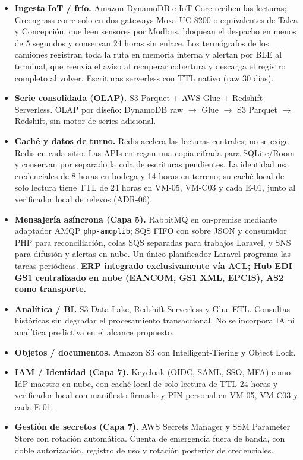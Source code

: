 \begin{itemize}
  \item \textbf{Ingesta IoT / frío.} Amazon DynamoDB e IoT Core reciben las lecturas; Greengrass corre solo en dos gateways Moxa UC-8200 o equivalentes de Talca y Concepción, que leen sensores por Modbus, bloquean el despacho en menos de 5 segundos y conservan 24 horas sin enlace. Los termógrafos de los camiones registran toda la ruta en memoria interna y alertan por BLE al terminal, que reenvía el aviso al recuperar cobertura y descarga el registro completo al volver. Escrituras serverless con TTL nativo (raw 30 días).
  \item \textbf{Serie consolidada (OLAP).} S3 Parquet + AWS Glue + Redshift Serverless. OLAP por diseño: DynamoDB raw $\rightarrow$ Glue $\rightarrow$ S3 Parquet $\rightarrow$ Redshift, sin motor de series adicional.
  \item \textbf{Caché y datos de turno.} Redis acelera las lecturas centrales; no se exige Redis en cada sitio. Las APIs entregan una copia cifrada para SQLite/Room y conservan por separado la cola de escrituras pendientes. La identidad usa credenciales de 8 horas en bodega y 14 horas en terreno; su caché local de solo lectura tiene TTL de 24 horas en VM-05, VM-C03 y cada E-01, junto al verificador local de relevos (ADR-06).
  \item \textbf{Mensajería asíncrona (Capa 5).} RabbitMQ en on-premise mediante adaptador AMQP \texttt{php-amqplib}; SQS FIFO con sobre JSON y consumidor PHP para reconciliación, colas SQS separadas para trabajos Laravel, y SNS para difusión y alertas en nube. Un único planificador Laravel programa las tareas periódicas. \textbf{ERP integrado exclusivamente vía ACL; Hub EDI GS1 centralizado en nube (EANCOM, GS1 XML, EPCIS), AS2 como transporte.}
  \item \textbf{Analítica / BI.} S3 Data Lake, Redshift Serverless y Glue ETL. Consultas históricas sin degradar el procesamiento transaccional. No se incorpora IA ni analítica predictiva en el alcance propuesto.
  \item \textbf{Objetos / documentos.} Amazon S3 con Intelligent-Tiering y Object Lock.
  \item \textbf{IAM / Identidad (Capa 7).} Keycloak (OIDC, SAML, SSO, MFA) como IdP maestro en nube, con caché local de solo lectura de TTL 24 horas y verificador local con manifiesto firmado y PIN personal en VM-05, VM-C03 y cada E-01.
  \item \textbf{Gestión de secretos (Capa 7).} AWS Secrets Manager y SSM Parameter Store con rotación automática. Cuenta de emergencia fuera de banda, con doble autorización, registro de uso y rotación posterior de credenciales.

\end{itemize}
